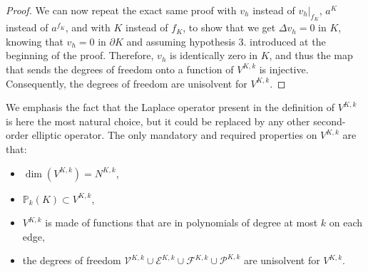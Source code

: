 \begin{proof}
We can now repeat the exact same proof with $v_h$ instead of $v_h|_{f_K}$, $a^K$ instead of $a^{f_K}$, and with $K$ instead of $f_K$, to show that we get $\Delta v_h = 0$ in $K$, knowing that $v_h = 0$ in $\partial K$ and assuming hypothesis $3.$ introduced at the beginning of the proof. Therefore, $v_h$ is identically zero in $K$, and thus the map that sends the degrees of freedom onto a function of $V^{K,k}$ is injective. Consequently, the degrees of freedom are unisolvent for $V^{K,k}$. 
\end{proof}

\begin{remark}
We emphasis the fact that the Laplace operator present in the definition of $V^{K,k}$ is here the most natural choice, but it could be replaced by any other second-order elliptic operator. The only mandatory and required properties on $V^{K,k}$ are that: 
\begin{itemize}
\item $\dim\left(V^{K,k}\right) = N^{K,k}$, 
\item $\mathbb{P}_{k}(K)\subset V^{K,k}$, 
\item $V^{K,k}$ is made of functions that are in polynomials of degree at most $k$ on each edge, 
\item the degrees of freedom $\mathcal{V}^{K,k}\cup\mathcal{E}^{K,k}\cup \mathcal{F}^{K,k}\cup\mathcal{P}^{K,k}$ are unisolvent for $V^{K,k}$.
\end{itemize}
\end{remark}
